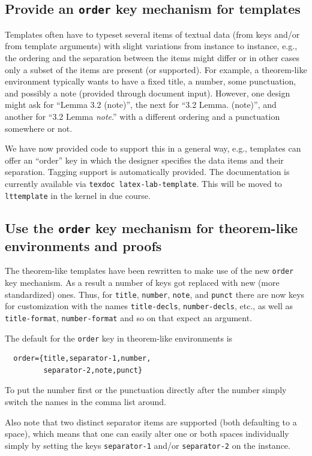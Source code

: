 \documentclass{ltnews}
\providecommand\key[1]{\texttt{#1}}
\begin{document}
\subsection{Provide an \key{order} key mechanism for templates}

Templates often have to typeset several items of textual data (from
keys and/or from template arguments) with slight variations from
instance to instance, e.g., the ordering and the separation between
the items might differ or in other cases only a subset of the items
are present (or supported). For example, a theorem-like environment
typically wants to have a fixed title, a number, some punctuation, and
possibly a note (provided through document input). However, one design
might ask for \enquote{Lemma 3.2 (note)}, the next for \enquote{3.2
  Lemma. (note)}, and another for \enquote{3.2 Lemma \textit{note}.}
with a different ordering and a punctuation somewhere or not.

We have now provided code to support this in a general way, e.g.,
templates can offer an \enquote{order} key in which the designer
specifies the data items and their separation. Tagging support is
automatically provided. The documentation is currently available via
\texttt{texdoc latex-lab-template}. This will be moved to
\texttt{lttemplate} in the kernel in due course.

\subsection{Use the \key{order} key mechanism for theorem-like environments and proofs}

The theorem-like templates have been rewritten to make use of the new
\key{order} key mechanism.  As a result a number of keys got replaced
with new (more standardized) ones. Thus, for \key{title},
\key{number}, \key{note}, and \key{punct} there are now keys for
customization with the names \key{title-decls}, \key{number-decls},
etc., as well as \key{title-format}, \key{number-format} and so on
that expect an argument.

The default for the \key{order} key in theorem-like environments is
\begin{verbatim}
  order={title,separator-1,number,
         separator-2,note,punct}
\end{verbatim}
To put the number first or the punctuation directly after the number
simply switch the names in the comma list around.

Also note that two distinct separator items are supported (both
defaulting to a space), which means that one can easily alter one or
both spaces individually simply by setting the keys \key{separator-1}
and/or \key{separator-2} on the instance.
\end{document}
